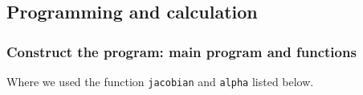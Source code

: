 \subsection{Programming and calculation}
\subsubsection{Construct the program: main program and functions}


Where we used the function \texttt{jacobian} and \texttt{alpha} listed below.










